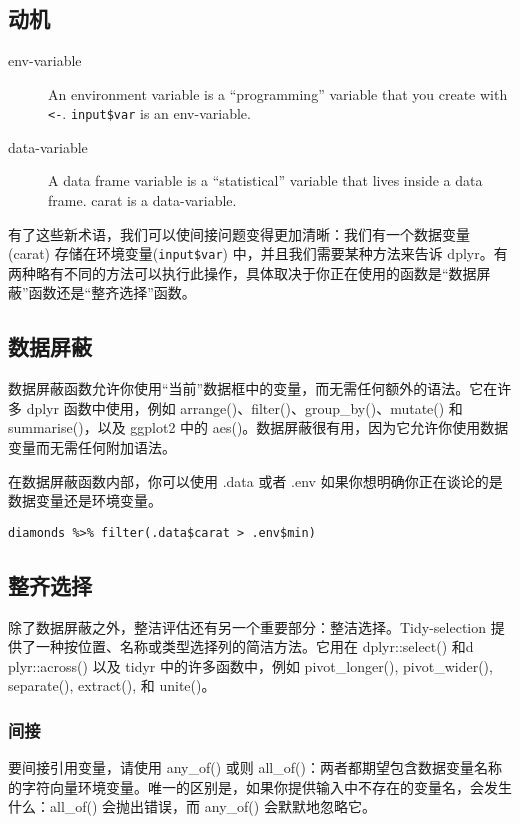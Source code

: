 \chapter{\label{ch12}}
\section{动机}
\begin{description}
    \item[env-variable]
        An environment variable is a “programming” variable that you create with \verb|<-|. \verb|input$var| is an env-variable.
    \item[data-variable] A data frame variable is a “statistical” variable that lives inside a data frame. carat is a data-variable.
\end{description}
有了这些新术语，我们可以使间接问题变得更加清晰：我们有一个数据变量(carat) 存储在环境变量(\verb|input$var|) 中，并且我们需要某种方法来告诉 dplyr。有两种略有不同的方法可以执行此操作，具体取决于你正在使用的函数是“数据屏蔽”函数还是“整齐选择”函数。

\section{数据屏蔽}
数据屏蔽函数允许你使用“当前”数据框中的变量，而无需任何额外的语法。它在许多 dplyr 函数中使用，例如 arrange()、filter()、group\_by()、mutate() 和 summarise()，以及 ggplot2 中的 aes()。数据屏蔽很有用，因为它允许你使用数据变量而无需任何附加语法。

在数据屏蔽函数内部，你可以使用 .data 或者 .env 如果你想明确你正在谈论的是数据变量还是环境变量。

\verb|diamonds %>% filter(.data$carat > .env$min)|

\section{整齐选择}
除了数据屏蔽之外，整洁评估还有另一个重要部分：整洁选择。Tidy-selection 提供了一种按位置、名称或类型选择列的简洁方法。它用在 dplyr::select() 和d plyr::across() 以及 tidyr 中的许多函数中，例如 pivot\_longer(), pivot\_wider(), separate(), extract(), 和 unite()。
\subsection{间接}
要间接引用变量，请使用 any\_of() 或则 all\_of()：两者都期望包含数据变量名称的字符向量环境变量。唯一的区别是，如果你提供输入中不存在的变量名，会发生什么：all\_of() 会抛出错误，而 any\_of() 会默默地忽略它。

